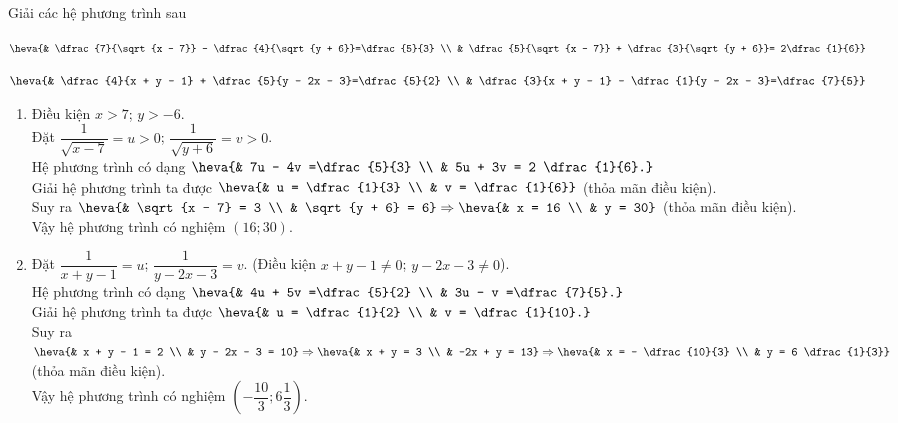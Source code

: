 \begin{bt}%
	Giải các hệ phương trình sau
	\begin{enumEX}{2}
	\item $\heva{& \dfrac{7}{\sqrt{x - 7}} - \dfrac{4}{\sqrt{y + 6}}=\dfrac{5}{3} \\ & \dfrac{5}{\sqrt{x - 7}} + \dfrac{3}{\sqrt{y + 6}}= 2\dfrac{1}{6}}$
	\item $\heva{& \dfrac{4}{x + y - 1} + \dfrac{5}{y - 2x - 3}=\dfrac{5}{2} \\ & \dfrac{3}{x + y - 1} - \dfrac{1}{y - 2x - 3}=\dfrac{7}{5}}$
	\end{enumEX}
	\loigiai
	{
	\begin{enumerate}
	\item Điều kiện $x > 7$; $y > -6$.\\
	Đặt $\dfrac{1}{\sqrt{x - 7}} = u > 0$; $\dfrac{1}{\sqrt{y + 6}}= v > 0$.\\
	Hệ phương trình có dạng 
	$\begin{aligned}[t]
	\heva{& 7u - 4v =\dfrac{5}{3} \\ & 5u + 3v = 2 \dfrac{1}{6}.}
	\end{aligned}$\\
	Giải hệ phương trình ta được $\heva{& u = \dfrac{1}{3} \\ & v = \dfrac{1}{6}}$ (thỏa mãn điều kiện).\\
	Suy ra $\heva{& \sqrt{x - 7} = 3 \\ & \sqrt{y + 6} = 6} \Rightarrow \heva{& x = 16 \\ & y = 30}$ (thỏa mãn điều kiện).\\
	Vậy hệ phương trình có nghiệm $(16 ; 30)$.
	\item Đặt $\dfrac{1}{x + y - 1}= u$; $\dfrac{1}{y - 2x - 3} = v$. (Điều kiện $x + y - 1 \neq 0$; $y - 2x - 3 \neq 0$).\\
	Hệ phương trình có dạng $\heva{& 4u + 5v =\dfrac{5}{2} \\ & 3u - v =\dfrac{7}{5}.}$\\
	Giải hệ phương trình ta được $\heva{& u = \dfrac{1}{2} \\ & v = \dfrac{1}{10}.}$\\
	Suy ra $\heva{& x + y - 1 = 2 \\ & y - 2x - 3 = 10} \Rightarrow \heva{& x + y = 3 \\ & -2x + y = 13} \Rightarrow \heva{& x = - \dfrac{10}{3} \\ & y = 6 \dfrac{1}{3}}$ (thỏa mãn điều kiện).\\
	Vậy hệ phương trình có nghiệm $\left( - \dfrac{10}{3};6 \dfrac{1}{3} \right) $.
	\end{enumerate}
	}
\end{bt}

